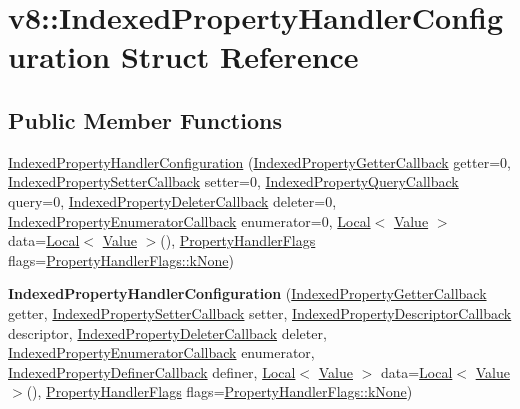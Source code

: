 \hypertarget{structv8_1_1IndexedPropertyHandlerConfiguration}{}\section{v8\+:\+:Indexed\+Property\+Handler\+Configuration Struct Reference}
\label{structv8_1_1IndexedPropertyHandlerConfiguration}
\subsection*{Public Member Functions}
\begin{DoxyCompactItemize}
\item 
\mbox{\hyperlink{structv8_1_1IndexedPropertyHandlerConfiguration_a1e474ac223c5b502e6eab8b0336f9fe7}{Indexed\+Property\+Handler\+Configuration}} (\mbox{\hyperlink{namespacev8_a48e7816ba64447bf32a25d194588daaf}{Indexed\+Property\+Getter\+Callback}} getter=0, \mbox{\hyperlink{namespacev8_a4ac7cc6185ebc8b6a199f9fa8e6bf5c3}{Indexed\+Property\+Setter\+Callback}} setter=0, \mbox{\hyperlink{namespacev8_a980b62c33eb664783e61e25c3b27f9ee}{Indexed\+Property\+Query\+Callback}} query=0, \mbox{\hyperlink{namespacev8_a53863728de14cde48dd6543207b2f2da}{Indexed\+Property\+Deleter\+Callback}} deleter=0, \mbox{\hyperlink{namespacev8_adbb0a6d5537371953f9ba807d4f6275e}{Indexed\+Property\+Enumerator\+Callback}} enumerator=0, \mbox{\hyperlink{classv8_1_1Local}{Local}}$<$ \mbox{\hyperlink{classv8_1_1Value}{Value}} $>$ data=\mbox{\hyperlink{classv8_1_1Local}{Local}}$<$ \mbox{\hyperlink{classv8_1_1Value}{Value}} $>$(), \mbox{\hyperlink{namespacev8_af4789f0aeb8680e353901a35810cac1a}{Property\+Handler\+Flags}} flags=\mbox{\hyperlink{namespacev8_af4789f0aeb8680e353901a35810cac1aa35c3ace1970663a16e5c65baa5941b13}{Property\+Handler\+Flags\+::k\+None}})
\item 
\mbox{\label{structv8_1_1IndexedPropertyHandlerConfiguration_a52a8b33b496a43f6864d6073f4951baf}} 
{\bfseries Indexed\+Property\+Handler\+Configuration} (\mbox{\hyperlink{namespacev8_a48e7816ba64447bf32a25d194588daaf}{Indexed\+Property\+Getter\+Callback}} getter, \mbox{\hyperlink{namespacev8_a4ac7cc6185ebc8b6a199f9fa8e6bf5c3}{Indexed\+Property\+Setter\+Callback}} setter, \mbox{\hyperlink{namespacev8_a7506e91d70d885b5cbeabdf870ac0e88}{Indexed\+Property\+Descriptor\+Callback}} descriptor, \mbox{\hyperlink{namespacev8_a53863728de14cde48dd6543207b2f2da}{Indexed\+Property\+Deleter\+Callback}} deleter, \mbox{\hyperlink{namespacev8_adbb0a6d5537371953f9ba807d4f6275e}{Indexed\+Property\+Enumerator\+Callback}} enumerator, \mbox{\hyperlink{namespacev8_a967435db933fa9798caac467948499df}{Indexed\+Property\+Definer\+Callback}} definer, \mbox{\hyperlink{classv8_1_1Local}{Local}}$<$ \mbox{\hyperlink{classv8_1_1Value}{Value}} $>$ data=\mbox{\hyperlink{classv8_1_1Local}{Local}}$<$ \mbox{\hyperlink{classv8_1_1Value}{Value}} $>$(), \mbox{\hyperlink{namespacev8_af4789f0aeb8680e353901a35810cac1a}{Property\+Handler\+Flags}} flags=\mbox{\hyperlink{namespacev8_af4789f0aeb8680e353901a35810cac1aa35c3ace1970663a16e5c65baa5941b13}{Property\+Handler\+Flags\+::k\+None}})
\end{DoxyCompactItemize}
